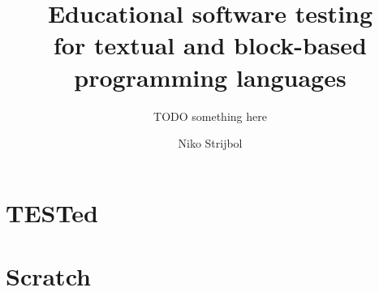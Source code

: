 \documentclass[
    paper=240mm:170mm,
    paper=portrait,
    parskip=half,
    cleardoublepage=plain,
    toc=chapterentrywithdots,
    chapterprefix=true,
    captions=tableheading,
    fontsize=10pt,
    mpinclude=true,
    DIV=13,
    BCOR=10mm
]{scrbook}
\author{Niko Strijbol}
\title{Educational software testing\\for textual and block-based programming languages}
\subtitle{TODO something here}
\newcommand{\tested}{TESTed}
\begin{document}
\frontmatter

{
    \selectfont\panno
    \maketitle
}



\tableofcontents

%
%
%

\mainmatter



\part{\tested{}}\label{part:tested}




\part{Scratch}\label{part:scratch}






\printbibliography[heading=bibintoc]
\end{document}
